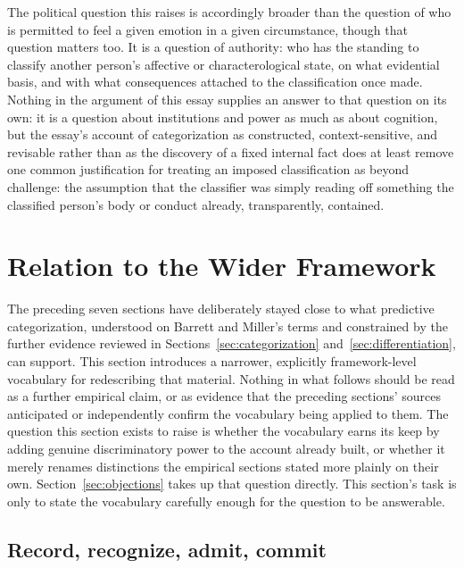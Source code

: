 \documentclass[11pt]{article}
\begin{document}
The political question this raises is accordingly broader than the question of who is permitted to feel a given emotion in a given circumstance, though that question matters too. It is a question of authority: who has the standing to classify another person's affective or characterological state, on what evidential basis, and with what consequences attached to the classification once made. Nothing in the argument of this essay supplies an answer to that question on its own: it is a question about institutions and power as much as about cognition, but the essay's account of categorization as constructed, context-sensitive, and revisable rather than as the discovery of a fixed internal fact does at least remove one common justification for treating an imposed classification as beyond challenge: the assumption that the classifier was simply reading off something the classified person's body or conduct already, transparently, contained.

\section{Relation to the Wider Framework}\label{sec:framework}

The preceding seven sections have deliberately stayed close to what predictive categorization, understood on Barrett and Miller's terms and constrained by the further evidence reviewed in Sections~\ref{sec:categorization} and~\ref{sec:differentiation}, can support. This section introduces a narrower, explicitly framework-level vocabulary for redescribing that material. Nothing in what follows should be read as a further empirical claim, or as evidence that the preceding sections' sources anticipated or independently confirm the vocabulary being applied to them. The question this section exists to raise is whether the vocabulary earns its keep by adding genuine discriminatory power to the account already built, or whether it merely renames distinctions the empirical sections stated more plainly on their own. Section~\ref{sec:objections} takes up that question directly. This section's task is only to state the vocabulary carefully enough for the question to be answerable.

\subsection{Record, recognize, admit, commit}
\end{document}

